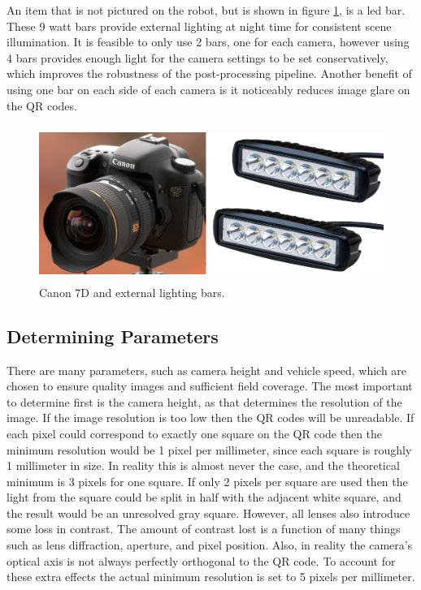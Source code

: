 An item that is not pictured on the robot, but is shown in figure \ref{figure:canon_and_bars}, is a \ac{led} bar.  These 9 watt bars provide external lighting at night time for consistent scene illumination.  It is feasible to only use 2 bars, one for each camera, however using 4 bars provides enough light for the camera settings to be set conservatively, which improves the robustness of the post-processing pipeline.  Another benefit of using one bar on each side of each camera is it noticeably reduces image glare on the QR codes.  

\begin{figure}
	\centering
    \includegraphics[height=2in]{figures/canon7d_and_LEDs.jpg}
    \caption[Canon 7D and LED bars]{Canon 7D and external lighting bars.}
    \label{figure:canon_and_bars}
\end{figure}

\subsection{Determining Parameters}
\label{section:determining_parameters}

There are many parameters, such as camera height and vehicle speed, which are chosen to ensure quality images and sufficient field coverage.  The most important to determine first is the camera height, as that determines the resolution of the image.  If the image resolution is too low then the QR codes will be unreadable.  
If each pixel could correspond to exactly one square on the QR code then the minimum resolution would be 1 pixel per millimeter, since each square is roughly 1 millimeter in size.  In reality this is almost never the case, and the theoretical minimum is 3 pixels for one square.  If only 2 pixels per square are used then the light from the square could be split in half with the adjacent white square, and the result would be an unresolved gray square.  However, all lenses also introduce some loss in contrast.  The amount of contrast lost is a function of many things such as lens diffraction, aperture, and pixel position.  Also, in reality the camera's optical axis is not always perfectly orthogonal to the QR code.  To account for these extra effects the actual minimum resolution is set to 5 pixels per millimeter.  

